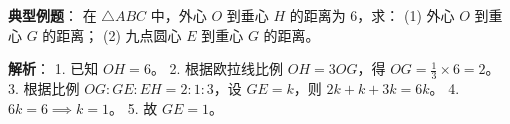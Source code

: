 \begin{examplebox}
\textbf{典型例题}：
在 $\triangle ABC$ 中，外心 $O$ 到垂心 $H$ 的距离为 $6$，求：
(1) 外心 $O$ 到重心 $G$ 的距离；
(2) 九点圆心 $E$ 到重心 $G$ 的距离。

\textbf{解析}：
1. 已知 $OH = 6$。
2. 根据欧拉线比例 $OH = 3OG$，得 $OG = \frac{1}{3} \times 6 = 2$。
3. 根据比例 $OG:GE:EH = 2:1:3$，设 $GE = k$，则 $2k+k+3k = 6k$。
4. $6k = 6 \implies k = 1$。
5. 故 $GE = 1$。
\end{examplebox}